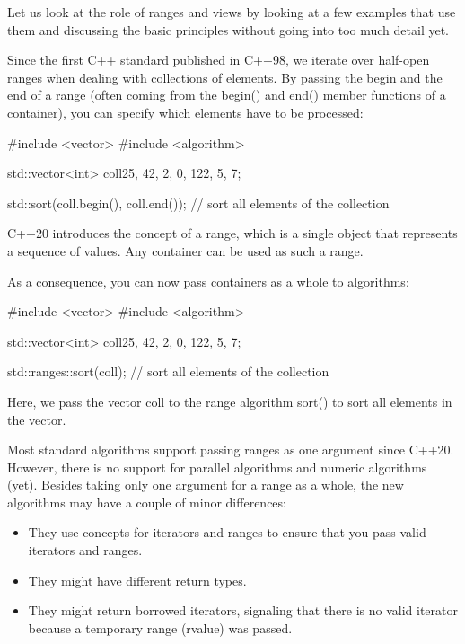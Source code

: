 

Let us look at the role of ranges and views by looking at a few examples that use them and discussing the basic principles without going into too much detail yet.


Since the first C++ standard published in C++98, we iterate over half-open ranges when dealing with collections of elements. By passing the begin and the end of a range (often coming from the begin() and end() member functions of a container), you can specify which elements have to be processed:

\begin{cpp}
#include <vector>
#include <algorithm>

std::vector<int> coll{25, 42, 2, 0, 122, 5, 7};

std::sort(coll.begin(), coll.end()); // sort all elements of the collection
\end{cpp}

C++20 introduces the concept of a range, which is a single object that represents a sequence of values. Any container can be used as such a range.

As a consequence, you can now pass containers as a whole to algorithms:

\begin{cpp}
#include <vector>
#include <algorithm>

std::vector<int> coll{25, 42, 2, 0, 122, 5, 7};

std::ranges::sort(coll); // sort all elements of the collection
\end{cpp}

Here, we pass the vector coll to the range algorithm sort() to sort all elements in the vector.

Most standard algorithms support passing ranges as one argument since C++20. However, there is no support for parallel algorithms and numeric algorithms (yet). Besides taking only one argument for a range as a whole, the new algorithms may have a couple of minor differences:

\begin{itemize}
\item
They use concepts for iterators and ranges to ensure that you pass valid iterators and ranges.

\item
They might have different return types.

\item
They might return borrowed iterators, signaling that there is no valid iterator because a temporary range (rvalue) was passed.
\end{itemize}

